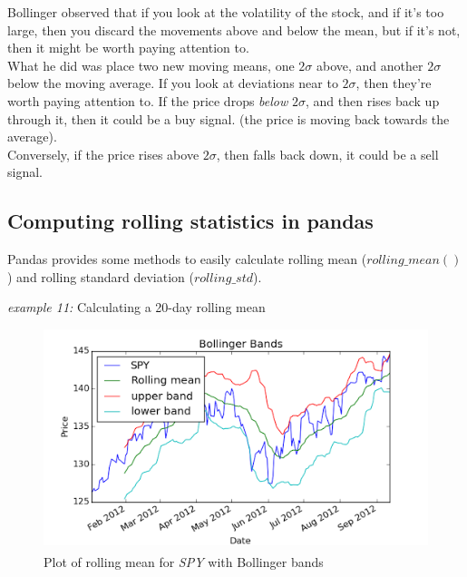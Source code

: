\noindent Bollinger observed that if you look at the volatility of the stock, and if it's too large, then you discard the movements above and below the mean, but if it's not, then it might be worth paying attention to.\\

\noindent What he did was place two new moving means, one $2\sigma$ above, and another $2\sigma$ below the moving average. If you look at deviations near to $2\sigma$, then they're worth paying attention to. If the price drops \textit{below} $2\sigma$, and then rises back up through it, then it could be a buy signal. (the price is moving back towards the average).\\

\noindent Conversely, if the price rises above $2\sigma$, then falls back down, it could be a sell signal.

\subsection{Computing rolling statistics in pandas}
\noindent Pandas provides some methods to easily calculate rolling mean ($rolling\_mean()$) and rolling standard deviation ($rolling\_std$).\\

\noindent\begin{minipage}{\linewidth}

\noindent\textit{example 11:} Calculating a 20-day rolling mean


\end{minipage}

\begin{figure}[h!]
	\centering
	\includegraphics[width=\textwidth]{images/bollinger_bands.png}
    \caption{Plot of rolling mean for \textit{SPY} with Bollinger bands\textsuperscript{\textregistered}}
\end{figure}
\newpage

